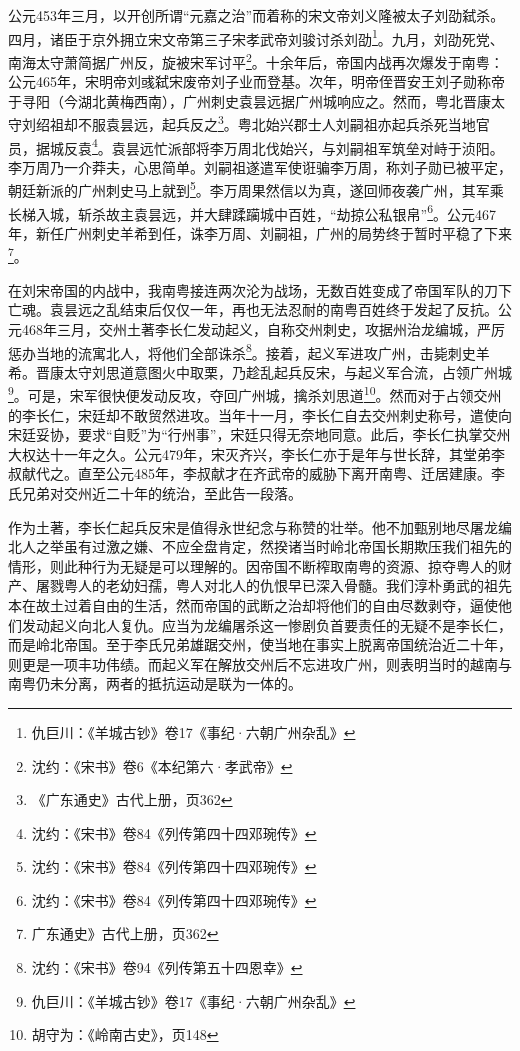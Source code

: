 公元453年三月，以开创所谓“元嘉之治”而着称的宋文帝刘义隆被太子刘劭弑杀。四月，诸臣于京外拥立宋文帝第三子宋孝武帝刘骏讨杀刘劭\footnote{仇巨川：《羊城古钞》卷17《事纪·六朝广州杂乱》}。九月，刘劭死党、南海太守萧简据广州反，旋被宋军讨平\footnote{沈约：《宋书》卷6《本纪第六·孝武帝》}。十余年后，帝国内战再次爆发于南粤：公元465年，宋明帝刘彧弑宋废帝刘子业而登基。次年，明帝侄晋安王刘子勋称帝于寻阳（今湖北黄梅西南），广州刺史袁昙远据广州城响应之。然而，粤北晋康太守刘绍祖却不服袁昙远，起兵反之\footnote{《广东通史》古代上册，页362}。粤北始兴郡士人刘嗣祖亦起兵杀死当地官员，据城反袁\footnote{沈约：《宋书》卷84《列传第四十四邓琬传》}。袁昙远忙派部将李万周北伐始兴，与刘嗣祖军筑垒对峙于浈阳。李万周乃一介莽夫，心思简单。刘嗣祖遂遣军使诳骗李万周，称刘子勋已被平定，朝廷新派的广州刺史马上就到\footnote{沈约：《宋书》卷84《列传第四十四邓琬传》}。李万周果然信以为真，遂回师夜袭广州，其军乘长梯入城，斩杀故主袁昙远，并大肆蹂躏城中百姓，“劫掠公私银帛”\footnote{沈约：《宋书》卷84《列传第四十四邓琬传》}。公元467年，新任广州刺史羊希到任，诛李万周、刘嗣祖，广州的局势终于暂时平稳了下来\footnote{广东通史》古代上册，页362}。

在刘宋帝国的内战中，我南粤接连两次沦为战场，无数百姓变成了帝国军队的刀下亡魂。袁昙远之乱结束后仅仅一年，再也无法忍耐的南粤百姓终于发起了反抗。公元468年三月，交州土著李长仁发动起义，自称交州刺史，攻据州治龙编城，严厉惩办当地的流寓北人，将他们全部诛杀\footnote{沈约：《宋书》卷94《列传第五十四恩幸》}。接着，起义军进攻广州，击毙刺史羊希。晋康太守刘思道意图火中取栗，乃趁乱起兵反宋，与起义军合流，占领广州城\footnote{仇巨川：《羊城古钞》卷17《事纪·六朝广州杂乱》}。可是，宋军很快便发动反攻，夺回广州城，擒杀刘思道\footnote{胡守为：《岭南古史》，页148}。然而对于占领交州的李长仁，宋廷却不敢贸然进攻。当年十一月，李长仁自去交州刺史称号，遣使向宋廷妥协，要求“自贬”为“行州事”，宋廷只得无奈地同意。此后，李长仁执掌交州大权达十一年之久。公元479年，宋灭齐兴，李长仁亦于是年与世长辞，其堂弟李叔献代之。直至公元485年，李叔献才在齐武帝的威胁下离开南粤、迁居建康。李氏兄弟对交州近二十年的统治，至此告一段落。

作为土著，李长仁起兵反宋是值得永世纪念与称赞的壮举。他不加甄别地尽屠龙编北人之举虽有过激之嫌、不应全盘肯定，然揆诸当时岭北帝国长期欺压我们祖先的情形，则此种行为无疑是可以理解的。因帝国不断榨取南粤的资源、掠夺粤人的财产、屠戮粤人的老幼妇孺，粤人对北人的仇恨早已深入骨髓。我们淳朴勇武的祖先本在故土过着自由的生活，然而帝国的武断之治却将他们的自由尽数剥夺，逼使他们发动起义向北人复仇。应当为龙编屠杀这一惨剧负首要责任的无疑不是李长仁，而是岭北帝国。至于李氏兄弟雄踞交州，使当地在事实上脱离帝国统治近二十年，则更是一项丰功伟绩。而起义军在解放交州后不忘进攻广州，则表明当时的越南与南粤仍未分离，两者的抵抗运动是联为一体的。

